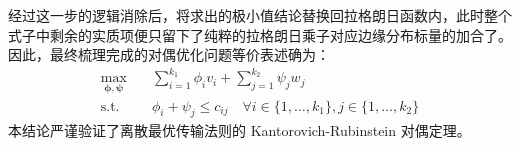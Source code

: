 \documentclass[11pt,UTF8]{ctexart}
\begin{document}
经过这一步的逻辑消除后，将求出的极小值结论替换回拉格朗日函数内，此时整个式子中剩余的实质项便只留下了纯粹的拉格朗日乘子对应边缘分布标量的加合了。因此，最终梳理完成的对偶优化问题等价表述确为：
\begin{align*}
    \max_{\boldsymbol{\phi}, \boldsymbol{\psi}} & \quad \sum_{i=1}^{k_1} \phi_i v_i + \sum_{j=1}^{k_2} \psi_j w_j \\
    \text{s.t.} & \quad \phi_i + \psi_j \leq c_{ij} \quad \forall i \in \{1, \dots, k_1\}, j \in \{1, \dots, k_2\}
\end{align*}
本结论严谨验证了离散最优传输法则的 Kantorovich-Rubinstein 对偶定理。
\end{document}
